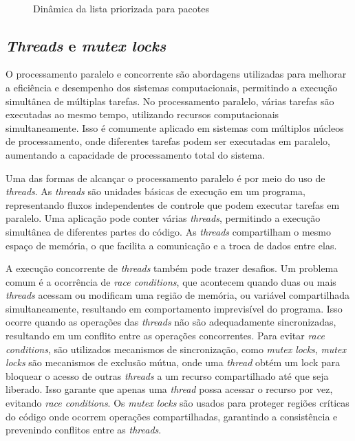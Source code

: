 \begin{figure}[ht]
	\centering
	\caption{Dinâmica da lista priorizada para pacotes}
	\\
	\label{fig:prio}
\end{figure}

\subsection{\textit{Threads} e \textit{mutex locks}}

O processamento paralelo e concorrente são abordagens utilizadas para melhorar a eficiência e desempenho dos sistemas computacionais, permitindo a execução simultânea de múltiplas tarefas. No processamento paralelo, várias tarefas são executadas ao mesmo tempo, utilizando recursos computacionais simultaneamente. Isso é comumente aplicado em sistemas com múltiplos núcleos de processamento, onde diferentes tarefas podem ser executadas em paralelo, aumentando a capacidade de processamento total do sistema.

Uma das formas de alcançar o processamento paralelo é por meio do uso de \textit{threads}. As \textit{threads} são unidades básicas de execução em um programa, representando fluxos independentes de controle que podem executar tarefas em paralelo. Uma aplicação pode conter várias \textit{threads}, permitindo a execução simultânea de diferentes partes do código. As \textit{threads} compartilham o mesmo espaço de memória, o que facilita a comunicação e a troca de dados entre elas.

A execução concorrente de \textit{threads} também pode trazer desafios. Um problema comum é a ocorrência de \textit{race conditions}, que acontecem quando duas ou mais \textit{threads} acessam ou modificam uma região de memória, ou variável compartilhada simultaneamente, resultando em comportamento imprevisível do programa. Isso ocorre quando as operações das \textit{threads} não são adequadamente sincronizadas, resultando em um conflito entre as operações concorrentes. Para evitar \textit{race conditions}, são utilizados mecanismos de sincronização, como \textit{mutex locks}, \textit{mutex locks} são mecanismos de exclusão mútua, onde uma \textit{thread} obtém um lock para bloquear o acesso de outras \textit{threads} a um recurso compartilhado até que seja liberado. Isso garante que apenas uma \textit{thread} possa acessar o recurso por vez, evitando \textit{race conditions}. Os \textit{mutex locks} são usados para proteger regiões críticas do código onde ocorrem operações compartilhadas, garantindo a consistência e prevenindo conflitos entre as \textit{threads}.

